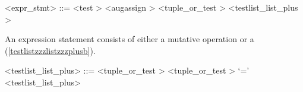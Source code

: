 
\label{exprzzzstmtb}

\begin{grammar}
<expr_stmt> ::= <test \myref[testb]> <augassign \myref[augassignb]> <tuple_or_test \myref[tuplezzzorzzztestb]>
	\alt <testlist_list_plus \myref[testlistzzzlistzzzplusb]>
\end{grammar}


An expression statement consists of either a mutative operation or a  (\ref{testlistzzzlistzzzplusb}). %

\label{testlistzzzlistzzzplusb}

\begin{grammar}
<testlist_list_plus> ::= <tuple_or_test \myref[tuplezzzorzzztestb]>
	\alt <tuple_or_test \myref[tuplezzzorzzztestb]> `=' <testlist_list_plus>
\end{grammar}

